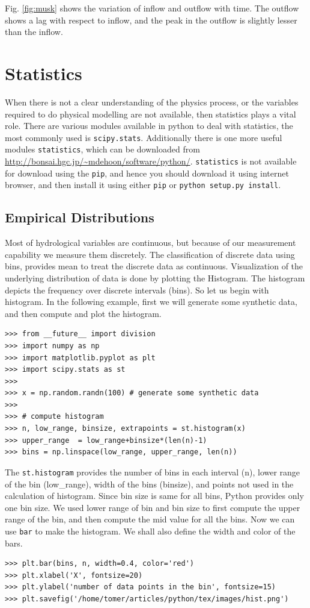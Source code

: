 \documentclass[10pt]{book}
\begin{document}
{Fig. \ref{fig:musk} shows the variation of inflow and outflow with time. The outflow shows a lag with respect to inflow, and the peak in the outflow is slightly lesser than the inflow.

\chapter{Statistics}
When there is not a clear understanding of the physics process, or the variables required to do physical modelling are not available, then statistics plays a vital role. There are various modules available in python to deal with statistics, the most commonly used is \verb"scipy.stats". Additionally there is one more useful modules \verb"statistics", which can be downloaded from \url{http://bonsai.hgc.jp/~mdehoon/software/python/}. \verb"statistics" is not available for download using the \verb"pip", and hence you should download it using internet browser, and then install it using either \verb"pip" or \verb"python setup.py install". 

\section{Empirical Distributions}
Most of hydrological variables are continuous, but because of our measurement capability we measure them discretely. The classification of discrete data using bins, provides mean to treat the discrete data as continuous. Visualization of the underlying distribution of data is done by plotting the Histogram.  The histogram depicts the frequency over discrete intervals (bins). So let us begin with histogram. In the following example, first we will generate some synthetic data, and then compute and plot the histogram. 

\beforeverb \begin{verbatim}
>>> from __future__ import division
>>> import numpy as np
>>> import matplotlib.pyplot as plt
>>> import scipy.stats as st
>>> 
>>> x = np.random.randn(100) # generate some synthetic data
>>> 
>>> # compute histogram
>>> n, low_range, binsize, extrapoints = st.histogram(x)
>>> upper_range  = low_range+binsize*(len(n)-1)
>>> bins = np.linspace(low_range, upper_range, len(n))
\end{verbatim} \afterverb
The \verb"st.histogram" provides the number of bins in each interval (n), lower range of the bin (low\_range), width of the bins (binsize), and points not used in the calculation of histogram. Since bin size is same for all bins, Python provides only one bin size. We used lower range of bin and bin size to first compute the upper range of the bin, and then compute the mid value for all the bins. Now we can use \verb"bar" to make the histogram. We shall also define the width and color of the bars. 
\beforeverb \begin{verbatim}
>>> plt.bar(bins, n, width=0.4, color='red')
>>> plt.xlabel('X', fontsize=20)
>>> plt.ylabel('number of data points in the bin', fontsize=15)
>>> plt.savefig('/home/tomer/articles/python/tex/images/hist.png')
\end{verbatim} \afterverb

}
\end{document}
